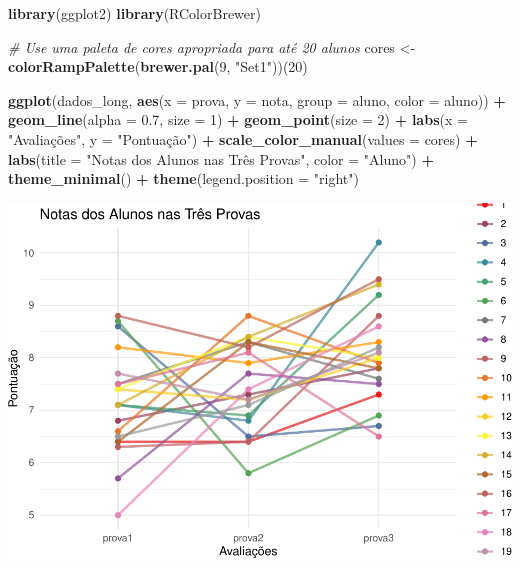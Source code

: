 \documentclass[
]{book}
\newenvironment{Shaded}{\begin{snugshade}}{\end{snugshade}}
\newcommand{\AttributeTok}[1]{\textcolor[rgb]{0.13,0.29,0.53}{#1}}
\newcommand{\CommentTok}[1]{\textcolor[rgb]{0.56,0.35,0.01}{\textit{#1}}}
\newcommand{\DecValTok}[1]{\textcolor[rgb]{0.00,0.00,0.81}{#1}}
\newcommand{\FloatTok}[1]{\textcolor[rgb]{0.00,0.00,0.81}{#1}}
\newcommand{\FunctionTok}[1]{\textcolor[rgb]{0.13,0.29,0.53}{\textbf{#1}}}
\newcommand{\NormalTok}[1]{#1}
\newcommand{\OtherTok}[1]{\textcolor[rgb]{0.56,0.35,0.01}{#1}}
\newcommand{\SpecialCharTok}[1]{\textcolor[rgb]{0.81,0.36,0.00}{\textbf{#1}}}
\newcommand{\StringTok}[1]{\textcolor[rgb]{0.31,0.60,0.02}{#1}}
\begin{document}
\begin{Shaded}
\begin{Highlighting}[]
\FunctionTok{library}\NormalTok{(ggplot2)}
\FunctionTok{library}\NormalTok{(RColorBrewer)}

\CommentTok{\# Use uma paleta de cores apropriada para até 20 alunos}
\NormalTok{cores }\OtherTok{\textless{}{-}} \FunctionTok{colorRampPalette}\NormalTok{(}\FunctionTok{brewer.pal}\NormalTok{(}\DecValTok{9}\NormalTok{, }\StringTok{"Set1"}\NormalTok{))(}\DecValTok{20}\NormalTok{)}

\FunctionTok{ggplot}\NormalTok{(dados\_long, }\FunctionTok{aes}\NormalTok{(}\AttributeTok{x =}\NormalTok{ prova, }\AttributeTok{y =}\NormalTok{ nota, }\AttributeTok{group =}\NormalTok{ aluno, }\AttributeTok{color =}\NormalTok{ aluno)) }\SpecialCharTok{+}
  \FunctionTok{geom\_line}\NormalTok{(}\AttributeTok{alpha =} \FloatTok{0.7}\NormalTok{, }\AttributeTok{size =} \DecValTok{1}\NormalTok{) }\SpecialCharTok{+}
  \FunctionTok{geom\_point}\NormalTok{(}\AttributeTok{size =} \DecValTok{2}\NormalTok{) }\SpecialCharTok{+}
  \FunctionTok{labs}\NormalTok{(}\AttributeTok{x =} \StringTok{"Avaliações"}\NormalTok{, }\AttributeTok{y =} \StringTok{"Pontuação"}\NormalTok{) }\SpecialCharTok{+}
  \FunctionTok{scale\_color\_manual}\NormalTok{(}\AttributeTok{values =}\NormalTok{ cores) }\SpecialCharTok{+}
  \FunctionTok{labs}\NormalTok{(}\AttributeTok{title =} \StringTok{"Notas dos Alunos nas Três Provas"}\NormalTok{, }\AttributeTok{color =} \StringTok{"Aluno"}\NormalTok{) }\SpecialCharTok{+}
  \FunctionTok{theme\_minimal}\NormalTok{() }\SpecialCharTok{+}
  \FunctionTok{theme}\NormalTok{(}\AttributeTok{legend.position =} \StringTok{"right"}\NormalTok{)}
\end{Highlighting}
\end{Shaded}

\includegraphics{LivroEstatisticaR_files/figure-latex/AnovaRgtest-1.pdf}
\end{document}
